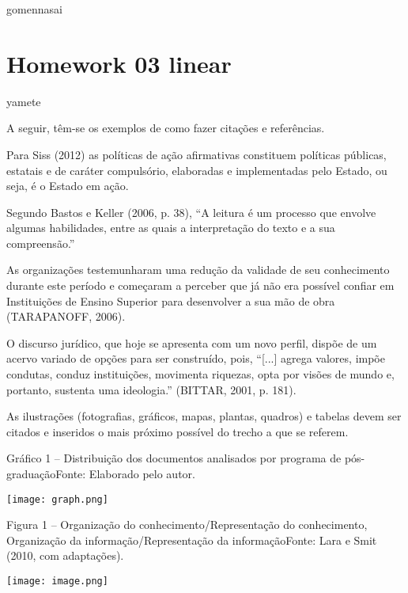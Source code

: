 gomennasai
\section{Homework 03 linear}

yamete

\jump

A seguir, têm-se os exemplos de como fazer citações e referências.

\jump

Para Siss (2012) as políticas de ação afirmativas constituem políticas públicas, estatais e de caráter compulsório, elaboradas e implementadas pelo Estado, ou seja, é o Estado em ação.

Segundo Bastos e Keller (2006, p. 38), “A leitura é um processo que envolve algumas habilidades, entre as quais a interpretação do texto e a sua compreensão.”

As organizações testemunharam uma redução da validade de seu conhecimento durante este período e começaram a perceber que já não era possível confiar em Instituições de Ensino Superior para desenvolver a sua mão de obra (TARAPANOFF, 2006).

O discurso jurídico, que hoje se apresenta com um novo perfil, dispõe de um acervo variado de opções para ser construído, pois, “[...] agrega valores, impõe condutas, conduz instituições, movimenta riquezas, opta por visões de mundo e, portanto, sustenta uma ideologia.” (BITTAR, 2001, p. 181).


\jump

As ilustrações (fotografias, gráficos, mapas, plantas, quadros) e tabelas devem ser citados e inseridos o mais próximo possível do trecho a que se referem.

\jump

\begin{container}{10cm}{Gráfico 1 – Distribuição dos documentos analisados por programa de pós-graduação}{Fonte: Elaborado pelo autor.}

\texttt{[image: graph.png]}

\end{container}

\begin{container}{10cm}{Figura 1 – Organização do conhecimento/Representação do
conhecimento, Organização da informação/Representação da informação}{Fonte: Lara e Smit (2010, com adaptações).}

\texttt{[image: image.png]}

\end{container}

